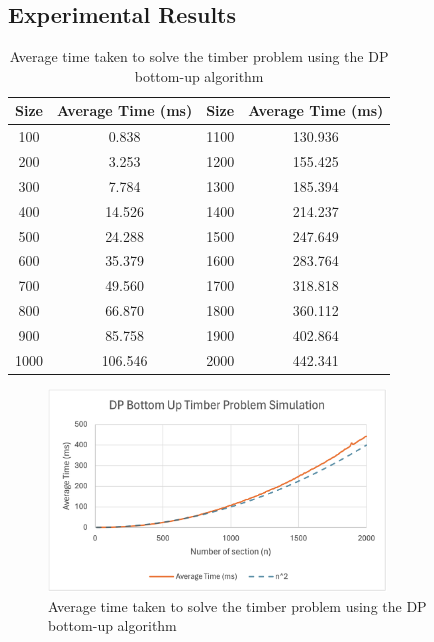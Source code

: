 \documentclass[12pt]{article}
\begin{document}
\subsection{Experimental Results}
\begin{table}[H]
    \caption{Average time taken to solve the timber problem using the DP bottom-up algorithm}
    \label{tab:timber_dp_bottom_up_results}
    \centering
    \begin{tabular}{|c|c|c|c|}
        \hline
        \textbf{Size} & \textbf{Average Time (ms)} & \textbf{Size} & \textbf{Average Time (ms)} \\
        \hline
        100           & 0.838                      & 1100          & 130.936                    \\ \hline
        200           & 3.253                      & 1200          & 155.425                    \\ \hline
        300           & 7.784                      & 1300          & 185.394                    \\ \hline
        400           & 14.526                     & 1400          & 214.237                    \\ \hline
        500           & 24.288                     & 1500          & 247.649                    \\ \hline
        600           & 35.379                     & 1600          & 283.764                    \\ \hline
        700           & 49.560                     & 1700          & 318.818                    \\ \hline
        800           & 66.870                     & 1800          & 360.112                    \\ \hline
        900           & 85.758                     & 1900          & 402.864                    \\ \hline
        1000          & 106.546                    & 2000          & 442.341                    \\ \hline
    \end{tabular}
\end{table}

\begin{figure}[H]
    \centering
    \includegraphics[width=0.8\textwidth]{results_plot.png}
    \caption{Average time taken to solve the timber problem using the  DP bottom-up algorithm}
    \label{fig:timber_dp_bottom_up_results}
\end{figure}
\end{document}
